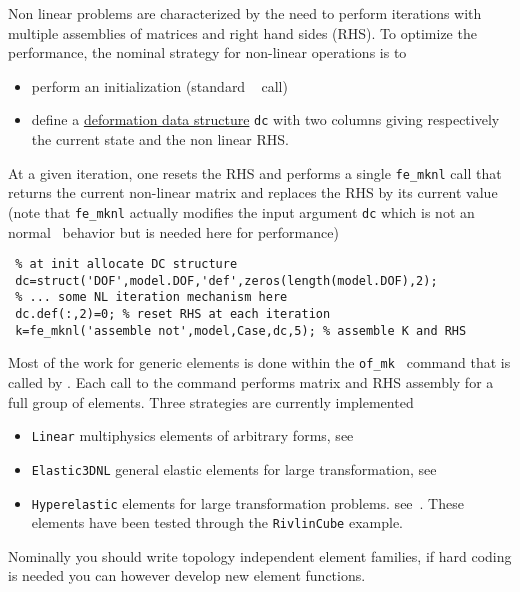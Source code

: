 Non linear problems are characterized by the need to perform iterations with multiple assemblies of matrices and right hand sides (RHS). To optimize the performance, the nominal strategy for non-linear operations is to 

\begin{itemize}
\item perform an initialization (standard \  call)
\item define a \hyperlink{def}{deformation data structure} {\tt dc} with two columns giving respectively the current state and the non linear RHS.
\end{itemize}

At a given iteration, one resets the RHS and performs a single {\tt fe\_mknl} call that returns the current non-linear matrix and replaces the RHS by its current value (note that {\tt fe\_mknl} actually modifies the input argument {\tt dc} which is not an normal \matlab\ behavior but is needed here for performance)

\begin{verbatim}
 % at init allocate DC structure
 dc=struct('DOF',model.DOF,'def',zeros(length(model.DOF),2); 
 % ... some NL iteration mechanism here
 dc.def(:,2)=0; % reset RHS at each iteration
 k=fe_mknl('assemble not',model,Case,dc,5); % assemble K and RHS
\end{verbatim}

Most of the work for generic elements is done within the {\tt of\_mk } command that is called by \femknl. Each call to the command performs matrix and RHS assembly for a full group of elements. Three strategies are currently implemented

\begin{itemize}
\item {\tt Linear} multiphysics elements of arbitrary forms, see~
\item {\tt Elastic3DNL} general elastic elements for large transformation,  see~
\item {\tt Hyperelastic} elements for large transformation problems. see~. These elements have been tested through the {\tt RivlinCube} example.
\end{itemize}


Nominally you should write topology independent element families, if hard coding is needed you can however develop new element functions.

